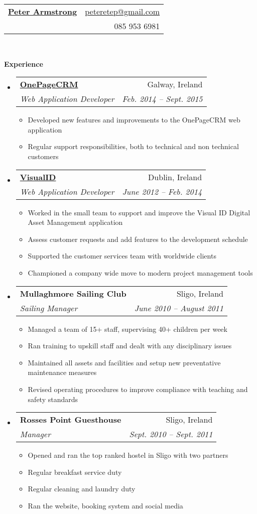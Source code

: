\documentclass[letterpaper,11pt]{article}
\makeatletter
\newcommand{\resitem}[1]{\item #1 \vspace{-2pt}}
\newcommand{\resheading}[1]{{\large \colorbox{mygrey}{\begin{minipage}{\textwidth}{\textbf{#1 \vphantom{p\^{E}}}}\end{minipage}}}}
\newcommand{\ressubheading}[4]{
\begin{tabular*}{6.5in}{l@{\extracolsep{\fill}}r}
		\textbf{#1} & #2 \\
		\textit{#3} & \textit{#4} \\
\end{tabular*}\vspace{-6pt}}
\makeatother
\begin{document}
\newcommand{\mywebheader}{
\begin{tabular*}{7in}{l@{\extracolsep{\fill}}r}
	\textbf{\href{http://www.peterarmstrong.ie/}{\LARGE Peter Armstrong}} & \href{mailto:peteretep@gmail.com}{peteretep@gmail.com}\\
	 & 085 953 6981
	\end{tabular*}
\\
\vspace{0.1in}}

\mywebheader


\resheading{Experience}
	\begin{itemize}
    \item 
      \ressubheading{\href{http://www.onepagecrm.com}{OnePageCRM}}{Galway, Ireland}
        {Web Application Developer}{Feb. 2014 -- Sept. 2015}
        { \footnotesize
        \begin{itemize}
          \resitem{Developed new features and improvements to the OnePageCRM web application }
          \resitem{Regular support responsibilities, both to technical and non technical customers}
        \end{itemize}
        }

      \item 
      \ressubheading{\href{http://visualid.com}{VisualID}}{Dublin, Ireland}{Web Application Developer}{June 2012 -- Feb. 2014}
        { \footnotesize
        \begin{itemize}
          \resitem{Worked in the small team to support and improve the Visual ID Digital Asset Management application}
          \resitem{Assess customer requests and add features to the development schedule}
          \resitem{Supported the customer services team with worldwide clients}
          \resitem{Championed a company wide move to modern project management tools}
        \end{itemize}
        }      
    \item
        \ressubheading{Mullaghmore Sailing Club}{Sligo, Ireland}{Sailing Manager}{June 2010 -- August 2011}
        {
        \begin{itemize}
        \resitem{Managed a team of 15+ staff, supervising 40+ children per week}
        \resitem{Ran training to upskill staff and dealt with any disciplinary issues}
        \resitem{Maintained all assets and facilities and setup new preventative maintenance measures}
        \resitem{Revised operating procedures to improve compliance with teaching and safety standards}
        \end{itemize}
        }
		  \item
      \ressubheading{Rosses Point Guesthouse}{Sligo, Ireland}{Manager}{Sept. 2010 -- Sept. 2011}
        {
        \begin{itemize}
      	  \resitem{Opened and ran the top ranked hostel in Sligo with two partners}
          \resitem{Regular breakfast service duty}
          \resitem{Regular cleaning and laundry duty}
          \resitem{Ran the website, booking system and social media}
        \end{itemize}
        }


\end{itemize}
\end{document}
